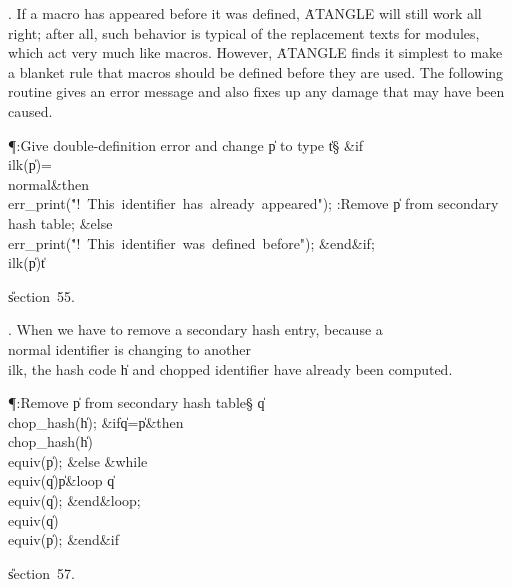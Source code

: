 . If a macro has appeared before it was defined, \.{ATANGLE} will still
work
all right; after all, such behavior is typical of the replacement texts for
modules, which act very much like macros. However, \.{ATANGLE} finds it
simplest to make a blanket rule that macros should be defined before they are
used. The following routine gives an error message and also fixes up any
damage that may have been caused.

\Y\P\?\4:Give double-definition error and change \|p to type \|t\X\S\?\6
\6
\&{if}\1\1\8\\{ilk}\?\1(\?\|p\?\2)=\?\\{normal}\2\8\&{then}\6
\\{err\_print}\?\1(\?\.{"!\ This\ identifier\ has\ already\ appeared"}\?\2)\?;\6
:Remove \|p from secondary hash table\X;\6
\4\&{else}\6
\\{err\_print}\?\1(\?\.{"!\ This\ identifier\ was\ defined\ before"}\?\2)\?;\2\6
\&{end}\8\2\&{if}\1;\6
\\{ilk}\?\1(\?\|p\?\2)\K\?\|t\par
\U section~55.\fi

. When we have to remove a secondary hash entry, because a \\{normal}
identifier is changing to another \\{ilk}, the hash code \|h and chopped
identifier have already been computed.

\Y\P\?\4:Remove \|p from secondary hash table\X\S\?\6
\|q\?\K\?\\{chop\_hash}\?\1(\?\|h\?\2)\?;\6
\&{if}\1\1\8\|q\?=\?\|p\2\8\&{then}\6
\\{chop\_hash}\?\1(\?\|h\?\2)\K\?\\{equiv}\?\1(\?\|p\?\2)\?;\6
\4\&{else}\6
\1\&{while}\8\\{equiv}\?\1(\?\|q\?\2)\I\?\|p\8\&{loop}\6
\|q\?\K\?\\{equiv}\?\1(\?\|q\?\2)\?;\2\6
\&{end}\8\&{loop};\6
\\{equiv}\?\1(\?\|q\?\2)\K\?\\{equiv}\?\1(\?\|p\?\2)\?;\2\6
\&{end}\8\2\&{if}\1\par
\U section~57.\fi

